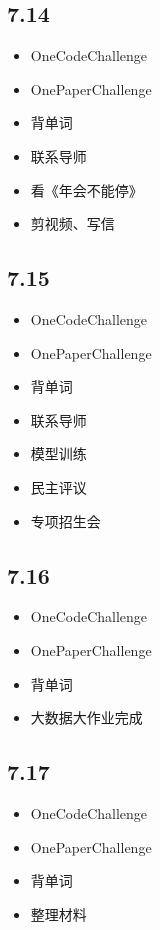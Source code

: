 \documentclass[UTF8]{ctexart}
\begin{document}
\subsection*{7.14}
\begin{itemize}
    \item OneCodeChallenge
    \item OnePaperChallenge
    \item 背单词
    \item 联系导师
    \item 看《年会不能停》
    \item 剪视频、写信
\end{itemize}

\subsection*{7.15}
\begin{itemize}
    \item OneCodeChallenge
    \item OnePaperChallenge
    \item 背单词
    \item 联系导师
    \item 模型训练
    \item 民主评议
    \item 专项招生会
\end{itemize}

\subsection*{7.16}
\begin{itemize}
    \item OneCodeChallenge
    \item OnePaperChallenge
    \item 背单词
    \item 大数据大作业完成
\end{itemize}

\subsection*{7.17}
\begin{itemize}
    \item OneCodeChallenge
    \item OnePaperChallenge
    \item 背单词
    \item 整理材料
\end{itemize}
\end{document}
